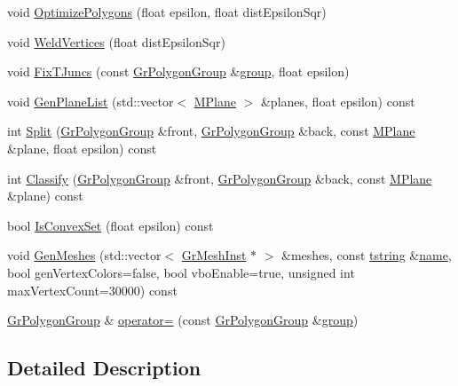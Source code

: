 \begin{CompactItemize}
\item 
void \hyperlink{class_gr_polygon_group_887ed72b43c9832341bd9059fb43d123}{OptimizePolygons} (float epsilon, float distEpsilonSqr)
\item 
void \hyperlink{class_gr_polygon_group_e361b892b9d9a739c82679e67eb689e7}{WeldVertices} (float distEpsilonSqr)
\item 
void \hyperlink{class_gr_polygon_group_1f1f0c55854848f37a12efe4f0bb1819}{FixTJuncs} (const \hyperlink{class_gr_polygon_group}{GrPolygonGroup} \&\hyperlink{wglext_8h_69cec9b28d037f2272131b4fcd148620}{group}, float epsilon)
\item 
void \hyperlink{class_gr_polygon_group_78b2f9321b1e04e636a5ea434326a010}{GenPlaneList} (std::vector$<$ \hyperlink{class_m_plane}{MPlane} $>$ \&planes, float epsilon) const 
\item 
int \hyperlink{class_gr_polygon_group_740ca90b8b5492d1da5b4195d9f2e82c}{Split} (\hyperlink{class_gr_polygon_group}{GrPolygonGroup} \&front, \hyperlink{class_gr_polygon_group}{GrPolygonGroup} \&back, const \hyperlink{class_m_plane}{MPlane} \&plane, float epsilon) const 
\item 
int \hyperlink{class_gr_polygon_group_7e0719fa01ae4b03cd135fdc91ff4697}{Classify} (\hyperlink{class_gr_polygon_group}{GrPolygonGroup} \&front, \hyperlink{class_gr_polygon_group}{GrPolygonGroup} \&back, const \hyperlink{class_m_plane}{MPlane} \&plane) const 
\item 
bool \hyperlink{class_gr_polygon_group_d158b0569c3feb64ba0bc71091eb3605}{IsConvexSet} (float epsilon) const 
\item 
void \hyperlink{class_gr_polygon_group_487e928a1d486489a0e0005cc0eb8669}{GenMeshes} (std::vector$<$ \hyperlink{class_gr_mesh_inst}{GrMeshInst} $\ast$ $>$ \&meshes, const \hyperlink{common__afx_8h_816fa58fd77499b0edb2c69ebe803d5c}{tstring} \&\hyperlink{glext__bak_8h_bb62efe59ccdd153ce42e1a418352209}{name}, bool genVertexColors=false, bool vboEnable=true, unsigned int maxVertexCount=30000) const 
\item 
\hyperlink{class_gr_polygon_group}{GrPolygonGroup} \& \hyperlink{class_gr_polygon_group_8142b681cb13a758fa82422c13506f00}{operator=} (const \hyperlink{class_gr_polygon_group}{GrPolygonGroup} \&\hyperlink{wglext_8h_69cec9b28d037f2272131b4fcd148620}{group})
\end{CompactItemize}


\subsection{Detailed Description}


